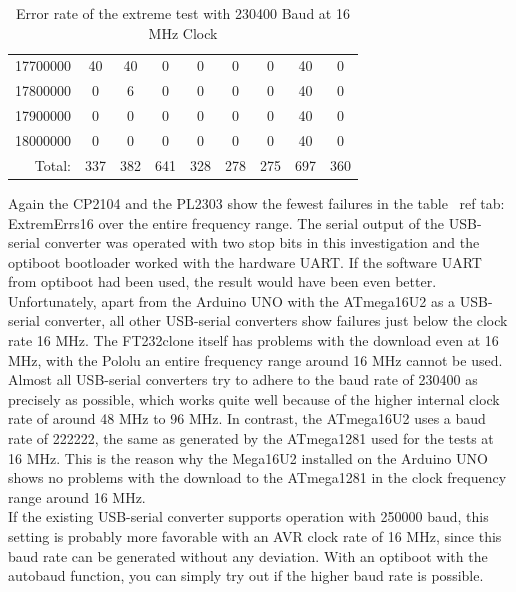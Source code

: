\begin{table}[H]
\begin{center}
\begin{tabular}{| c | c | c | c | c | c | c | c | c |}
17700000       &  40     &  40    &  0     & 0      & 0      & 0      & 40     & 0 \\
17800000       &  0      &  6     &  0     & 0      & 0      & 0      & 40     & 0 \\
17900000       &  0      &  0     &  0     & 0      & 0      & 0      & 40     & 0 \\
18000000       &  0      &  0     &  0     & 0      & 0      & 0      & 40     & 0 \\
    \hline
\multicolumn{1}{|r|}{Total:} &  337    &  382   &  641   & 328    & 278    & 275    & 697    & 360 \\
    \hline
    \end{tabular}
  \end{center}
  \caption{Error rate of the extreme test with 230400 Baud at 16 MHz Clock}
  \label{tab:ExtremErrs16}
\end{table}

Again the CP2104 and the PL2303 show the fewest failures in the table \ ref {tab: ExtremErrs16}
over the entire frequency range.
The serial output of the USB-serial converter was operated with two stop bits in this investigation
and the optiboot bootloader worked with the hardware UART.
If the software UART from optiboot had been used, the result would have been even better.
Unfortunately, apart from the Arduino UNO with the ATmega16U2 as a USB-serial converter,
all other USB-serial converters show failures just below the clock rate 16 MHz.
The FT232clone itself has problems with the download even at 16 MHz, with the Pololu
an entire frequency range around 16 MHz cannot be used.
Almost all USB-serial converters try to adhere to the baud rate of 230400 as precisely as possible,
which works quite well because of the higher internal clock rate of around 48 MHz to 96 MHz.
In contrast, the ATmega16U2 uses a baud rate of 222222, the same as generated by the ATmega1281
used for the tests at 16 MHz.
This is the reason why the Mega16U2 installed on the Arduino UNO shows no problems with the download
to the ATmega1281 in the clock frequency range around 16 MHz. \\

If the existing USB-serial converter supports operation with 250000 baud,
this setting is probably more favorable with an AVR clock rate of 16 MHz,
since this baud rate can be generated without any deviation.
With an optiboot with the autobaud function, you can simply try out if the higher baud rate is possible.


